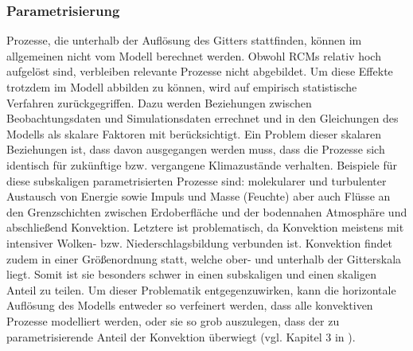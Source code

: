 \subsubsection{Parametrisierung} \label{sec:parametrisierung}
Prozesse, die unterhalb der Auflösung des Gitters stattfinden, können im allgemeinen nicht vom Modell berechnet werden. Obwohl RCMs relativ hoch aufgelöst sind, verbleiben relevante Prozesse nicht abgebildet. Um diese Effekte trotzdem im Modell abbilden zu können, wird auf empirisch statistische Verfahren zurückgegriffen. Dazu werden Beziehungen zwischen Beobachtungsdaten und Simulationsdaten errechnet und in den Gleichungen des Modells als skalare Faktoren mit berücksichtigt. Ein Problem dieser skalaren Beziehungen ist, dass davon ausgegangen werden muss, dass die Prozesse sich identisch für zukünftige bzw. vergangene Klimazustände verhalten. Beispiele für diese subskaligen parametrisierten Prozesse sind: molekularer und turbulenter Austausch von Energie sowie Impuls und Masse (Feuchte) aber auch Flüsse an den Grenzschichten zwischen Erdoberfläche und der bodennahen Atmosphäre und abschließend Konvektion. Letztere ist problematisch, da Konvektion meistens mit intensiver Wolken- bzw. Niederschlagsbildung verbunden ist. Konvektion findet zudem in einer Größenordnung statt, welche ober- und unterhalb der Gitterskala liegt. Somit ist sie besonders schwer in einen subskaligen und einen skaligen Anteil zu teilen. Um dieser Problematik entgegenzuwirken, kann die horizontale Auflösung des Modells entweder so verfeinert werden, dass alle konvektiven Prozesse modelliert werden, oder sie so grob auszulegen, dass der zu parametrisierende Anteil der Konvektion überwiegt (vgl. Kapitel 3 in \cite{RCM}).
